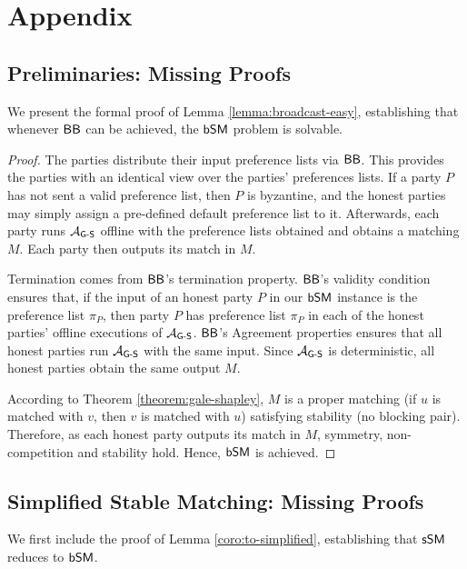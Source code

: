 \section{Appendix}
\subsection{Preliminaries: Missing Proofs}\label{appendix:preliminaries}
We present the formal proof of Lemma \ref{lemma:broadcast-easy}, establishing that whenever $\textsf{BB}$ can be achieved, the $\textsf{bSM}$ problem is solvable.
\BroadcastEasy*

\begin{proof}
The parties distribute their input preference lists via $\textsf{BB}$. This provides the parties with an identical view over the parties' preferences lists. If a party $P$ has not sent a valid preference list, then $P$ is byzantine, and the honest parties may simply assign a pre-defined default preference list to it. 
Afterwards, each party runs $\mathcal{A}_\textsf{G-S}$ offline with the preference lists obtained and obtains a matching $M$. Each party then outputs its match in $M$.

Termination comes from $\textsf{BB}$'s termination property. $\textsf{BB}$'s validity condition ensures that, if the input of an honest party $P$ in our $\textsf{bSM}$ instance is the preference list $\pi_P$, then party $P$ has preference list $\pi_P$ in each of the honest parties' offline executions of $\mathcal{A}_\textsf{G-S}$.
$\textsf{BB}$'s Agreement properties ensures that all honest parties run $\mathcal{A}_\textsf{G-S}$ with the same input. Since $\mathcal{A}_\textsf{G-S}$ is deterministic, all honest parties obtain the same output $M$. 

According to Theorem \ref{theorem:gale-shapley}, $M$ is a proper matching (if $u$ is matched with $v$, then $v$ is matched with $u$) satisfying stability (no blocking pair). Therefore, as each honest party outputs its match in $M$, symmetry, non-competition and stability hold. Hence, $\textsf{bSM}$ is achieved.
\end{proof}


\subsection{Simplified Stable Matching: Missing Proofs} \label{appendix:simplified-stable-matching}

We first include the proof of Lemma \ref{coro:to-simplified}, establishing that $\textsf{sSM}$ reduces to $\textsf{bSM}$.

\SimplifiedReduction*

